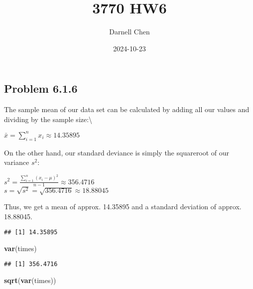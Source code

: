 \documentclass[
]{article}
\title{3770 HW6}
\author{Darnell Chen}
\date{2024-10-23}
\newenvironment{Shaded}{\begin{snugshade}}{\end{snugshade}}
\newcommand{\AttributeTok}[1]{\textcolor[rgb]{0.13,0.29,0.53}{#1}}
\newcommand{\ConstantTok}[1]{\textcolor[rgb]{0.56,0.35,0.01}{#1}}
\newcommand{\FunctionTok}[1]{\textcolor[rgb]{0.13,0.29,0.53}{\textbf{#1}}}
\newcommand{\NormalTok}[1]{#1}
\newcommand{\OtherTok}[1]{\textcolor[rgb]{0.56,0.35,0.01}{#1}}
\newcommand{\SpecialCharTok}[1]{\textcolor[rgb]{0.81,0.36,0.00}{\textbf{#1}}}
\newcommand{\StringTok}[1]{\textcolor[rgb]{0.31,0.60,0.02}{#1}}
\begin{document}
\maketitle

\subsection{Problem 6.1.6}\label{problem-6.1.6}

The sample mean of our data set can be calculated by adding all our
values and dividing by the sample size:\textbackslash{}

\(\bar{x} = \sum_{i=1}^n x_i \approx 14.35895\)

On the other hand, our standard deviance is simply the squareroot of our
variance \(s^2\):

\(s^2 = \frac{\sum_{i=1}^n (x_i - \mu)^2}{n-1} \approx 356.4716\)\\
\(s = \sqrt{s^2} = \sqrt{356.4716} \approx 18.88045\)

Thus, we get a mean of approx. 14.35895 and a standard deviation of
approx. 18.88045.

\begin{Shaded}
\end{Shaded}

\begin{verbatim}
## [1] 14.35895
\end{verbatim}

\begin{Shaded}
\begin{Highlighting}[]
\FunctionTok{var}\NormalTok{(times)}
\end{Highlighting}
\end{Shaded}

\begin{verbatim}
## [1] 356.4716
\end{verbatim}

\begin{Shaded}
\begin{Highlighting}[]
\FunctionTok{sqrt}\NormalTok{(}\FunctionTok{var}\NormalTok{(times))}
\end{Highlighting}
\end{Shaded}
\end{document}
